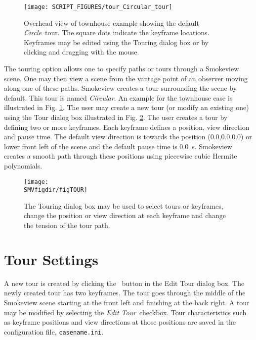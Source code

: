 \documentclass[11pt,twoside]{book}
\newcommand{\frameit}[1]{\fbox{\tt #1}}
\begin{document}
\begin{figure}[bph]
\begin{center}
\texttt{[image: SCRIPT\_FIGURES/tour\_Circular\_tour]}\\
\end{center}
\caption[Overhead view of the townhouse example showing the
default {\em Circle}\ tour.]{Overhead view
of townhouse example showing the default {\em Circle}\ tour.
The square dots indicate the keyframe
locations. Keyframes may be edited using the Touring
dialog box or by clicking and dragging with the mouse.}
 \label{figTOUREXAMPLE}
\end{figure}

The touring option allows one to specify paths or tours through a
Smokeview scene.  One may then view a scene from the vantage point of an
observer moving along one of these paths. Smokeview creates a tour surrounding
the scene by default.  This tour is named {\em Circular}.
An example for the townhouse case is illustrated
in Fig. \ref{figTOUREXAMPLE}.
The user may create a new tour (or modify an existing one) using the Tour
dialog box illustrated in Fig. \ref{figTOUR}. The user creates a tour by
defining two or more keyframes. Each keyframe defines a position, view direction and pause time.
The default view direction is towards the position (0.0,0.0,0.0) or lower front left of the scene and the default pause time is 0.0~s.
Smokeview creates a smooth
path through these positions using piecewise cubic Hermite polynomials.

\begin{figure}[bph]
\begin{center}
\texttt{[image: \\SMVfigdir/figTOUR]}
\end{center}
\caption[Touring dialog box.]{The Touring dialog
box may be used to select tours or keyframes, change the
position or view direction at each keyframe and change the tension
of the tour path. }
 \label{figTOUR}
\end{figure}

\section{Tour Settings}
A new tour is created
by clicking the \frameit{New Tour}\ button in the Edit Tour dialog box.
The newly created tour has two keyframes.  The tour
goes through the middle of the Smokeview scene starting at the
front left and finishing at the back right.
A tour may be modified by selecting the {\em Edit Tour}\ checkbox.
Tour characteristics such as keyframe positions and view directions at those positions
are saved in the configuration file, {\tt casename.ini}.
\end{document}
